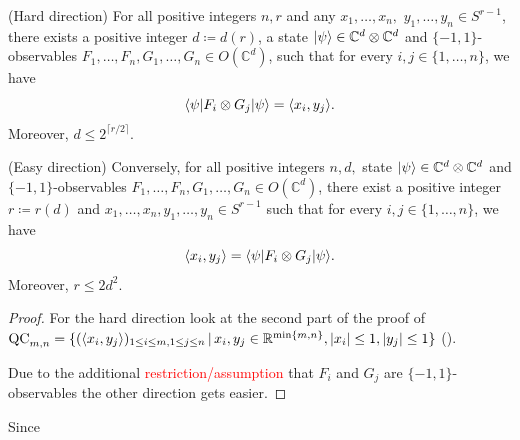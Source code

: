 	\begin{frame}
		\begin{theo}[Tsirelson] \label{theo:Tsirelson}
			(Hard direction) For all positive integers $n, r$ and any $x_1,\dots,x_n,$ $y_1,\dots,y_n\in S^{r-1}$, there exists a positive integer $d\coloneqq d(r)$, a state $\vert {\psi} \rangle\in\mathbb{C}^d\otimes\mathbb{C}^d$ and $\{-1,1\}$-observables $F_1,\dots,F_n,G_1,\dots,G_n\in O(\mathbb{C}^d)$, such that for every $i,j\in\{1,\dots,n\}$, we have
			\begin{equation}
				\langle {\psi} \vert F_i\otimes G_j \vert {\psi} \rangle = \langle{x_i},{y_j}\rangle.
			\end{equation}
			Moreover, $d\leq 2^{\lceil r/2 \rceil}$.
			
			(Easy direction) Conversely, for all positive integers $n,d,$ state $\vert {\psi} \rangle\in \mathbb{C}^d\otimes\mathbb{C}^d$ and $\{-1,1\}$-observables $F_1,\dots,F_n,G_1,\dots,G_n\in O(\mathbb{C}^d)$, there exist a positive integer $r\coloneqq r(d)$ and $x_1,\dots,x_n,y_1,\dots,y_n\in S^{r-1}$ such that for every $i,j\in\{1,\dots,n\}$, we have
			\begin{equation}
				\langle{x_i},{y_j}\rangle = \langle {\psi} \vert F_i\otimes G_j \vert {\psi} \rangle.
			\end{equation}
			Moreover, $r\leq 2d^2$.
		\end{theo}
	\end{frame}
	\begin{frame}
		\begin{proof}
			For the hard direction look at the second part of the proof of $\textup{QC}_{m,n} = \{(\langle{x_i},{y_j}\rangle)_{1\leq i\leq m, 1\leq j \leq n} \,| \, x_i,y_j \in \mathbb{R}^{\min\{m,n\}}, {\left|{x_i}\right|}\leq 1, {\left|{y_j}\right|}\leq 1\}$ (\hyperlink{QCMot<4>}{\beamerreturnbutton{Lemma}}).
			
			Due to the additional \textcolor{red}{restriction/assumption} that $F_i$ and $G_j$ are $\{-1,1\}$-observables the other direction gets easier.
			
		\end{proof}
	\end{frame}

	\begin{frame}
		Since 
	\end{frame}
